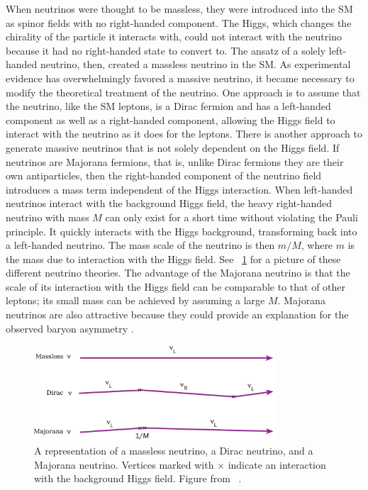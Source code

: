 When neutrinos were thought to be massless, they were introduced into the SM as spinor fields with no right-handed component.  The Higgs, which changes the chirality of the particle it interacts with, could not interact with the neutrino because it had no right-handed state to convert to.  The ansatz of a solely left-handed neutrino, then, created a massless neutrino in the SM.  As experimental evidence has overwhelmingly favored a massive neutrino, it became necessary to modify the theoretical treatment of the neutrino.  One approach is to assume that the neutrino, like the SM leptons, is a Dirac fermion and has a left-handed component as well as a right-handed component, allowing the Higgs field to interact with the neutrino as it does for the leptons.  There is another approach to generate massive neutrinos that is not solely dependent on the Higgs field.  If neutrinos are Majorana fermions, that is, unlike Dirac fermions they are their own antiparticles, then the right-handed component of the neutrino field introduces a mass term independent of the Higgs interaction.  When left-handed neutrinos interact with the background Higgs field, the heavy right-handed neutrino with mass $M$ can only exist for a short time without violating the Pauli principle.  It quickly interacts with the Higgs background, transforming back into a left-handed neutrino.  The mass scale of the neutrino is then $m/M$, where $m$ is the mass due to interaction with the Higgs field.  See {\fig}~\ref{fig:neutrinoMass} for a picture of these different neutrino theories.  The advantage of the Majorana neutrino is that the scale of its interaction with the Higgs field can be comparable to that of other leptons; its small mass can be achieved by assuming a large $M$.  Majorana neutrinos are also attractive because they could provide an explanation for the observed baryon asymmetry \cite{baryogenesis_Fukugita}.  
\begin{figure}[htp]
\centering
\includegraphics[width=0.8\textwidth]{figures/neutrinoMass.eps}
\caption{A representation of a massless neutrino, a Dirac neutrino, and a Majorana neutrino.  Vertices marked with $\times$ indicate an interaction with the background Higgs field.  Figure from {}~\cite{neutrinoMass}.}
\label{fig:neutrinoMass}
\end{figure}  

